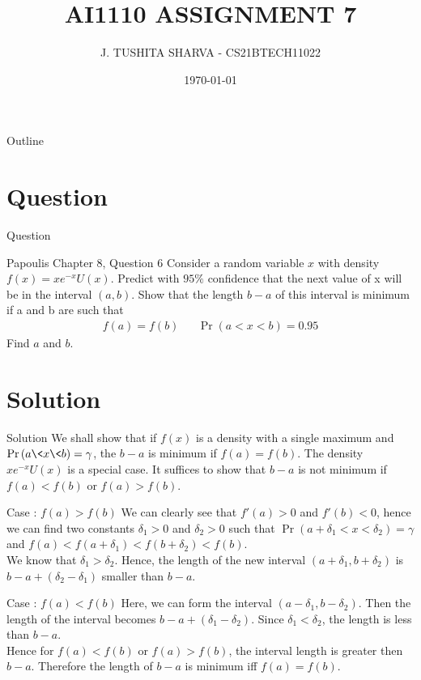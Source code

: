 \documentclass{beamer}
\title{AI1110 ASSIGNMENT 7}
\author{J. TUSHITA SHARVA - CS21BTECH11022}
\date{\today}
\providecommand{\pr}[1]{\ensuremath{\Pr\left(#1\right)}}
\providecommand{\brak}[1]{\ensuremath{\left(#1\right)}}
\numberwithin{equation}{subsection}
\begin{document}
\begin{frame}
    \titlepage 
\end{frame}

\logo{}

\begin{frame}{Outline}
    \tableofcontents
\end{frame}


\section{Question}
\begin{frame}{Question}
    \begin{block}{Papoulis Chapter 8, Question 6}
        Consider a random variable $x$ with density $f(x) = xe^{-x}U(x)$. Predict with $95\%$ confidence that the next value of x will be in the interval $(a, b)$. Show that the length $b-a$ of this interval is minimum if a and b are such that\\
        \begin{align}
            f(a) = f(b) && \pr{a < x < b} = 0.95
        \end{align}
        Find $a$ and $b$.
    \end{block}
\end{frame}

\section{Solution}
\begin{frame}{Solution}
     We shall show that if $f(x)$ is a density with a single maximum and $\pr{a \< x \< b} = \gamma$, the $b-a$ is minimum if $f(a) = f(b)$. The density $xe^{-x}U(x)$ is a special case. It suffices to show that $b-a$ is not minimum if $f(a) < f(b)$ or $f(a) > f(b)$.
\end{frame}


\begin{frame}{}

\begin{block}{Case : $f(a) > f(b)$}
        We can clearly see that $f'(a) > 0$ and $f'(b) < 0$, hence we can find two constants $\delta_1 > 0$ and $\delta_2 > 0$ such that $\pr{a+ \delta_1 < x < \delta_2} = \gamma$ and $f(a) < f(a + \delta_1) < f(b + \delta_2) < f(b)$.\\
    We know that $\delta_1 > \delta_2$. Hence, the length of the new interval $(a+\delta_1, b+\delta_2)$ is $b-a + (\delta_2-\delta_1)$ smaller than $b-a$.\\
\end{block}

\begin{block}{Case : $f(a) < f(b)$}
    Here, we can form the interval $\brak{a-\delta_1, b-\delta_2}$. Then the length of the interval becomes $b-a+ (\delta_1 - \delta_2)$. Since $\delta_1 < \delta_2$, the length is less than $b-a$. \\
    Hence for $f(a) < f(b)$ or $f(a) > f(b)$, the interval length is greater then $b-a$. Therefore the length of $b-a$ is minimum iff $f(a) = f(b)$.
\end{block}
\end{frame}
\end{document}
